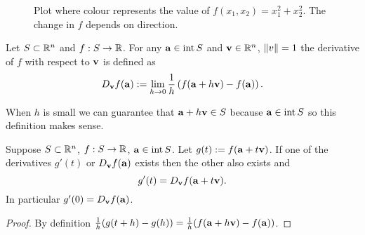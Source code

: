 \begin{figure}
    \begin{center}
        \caption{Plot where colour represents the value of \(f(x_1,x_2)=x_1^2 + x_2^2\). The change in \(f\) depends on direction.}
    \end{center}
\end{figure}




\begin{definition}
    Let \(S\subset \bR^n\) and \(f:S\to \bR\).
    For any \(\aa \in \operatorname{int}S\) and \(\vv \in \bR^n\), \(\norm{v}=1\) the derivative of \(f\) with respect to \(\vv\) is defined as
    \[
        D_{\vv}f(\aa) :=
        \lim_{h\to 0} \frac{1}{h}\left(  f(\aa+h \vv) - f(\aa)     \right).
    \]
\end{definition}


When \(h\) is small we can guarantee that \(\aa + h \vv \in S\) because \(\aa\in \operatorname{int} S\) so this definition makes sense.




\begin{theorem}
    Suppose \(S\subset \bR^n\), \(f:S\to \bR\), \(\aa \in \operatorname{int} S\).
    Let \(g(t) := f(\aa + t\vv)\).
    If one of the derivatives \(g'(t)\) or \(D_\vv f(\aa)\) exists then the other also exists and
    \[
        g'(t) = D_{\vv}f(\aa+t \vv).
    \]
    In particular \(g'(0) = D_{\vv}f(\aa)\).
\end{theorem}


\begin{proof}
    By definition \(\frac{1}{h}(g(t+h)-g(h)) =\frac{1}{h}(f(\aa+h \vv) - f(\aa)) \).
\end{proof}

